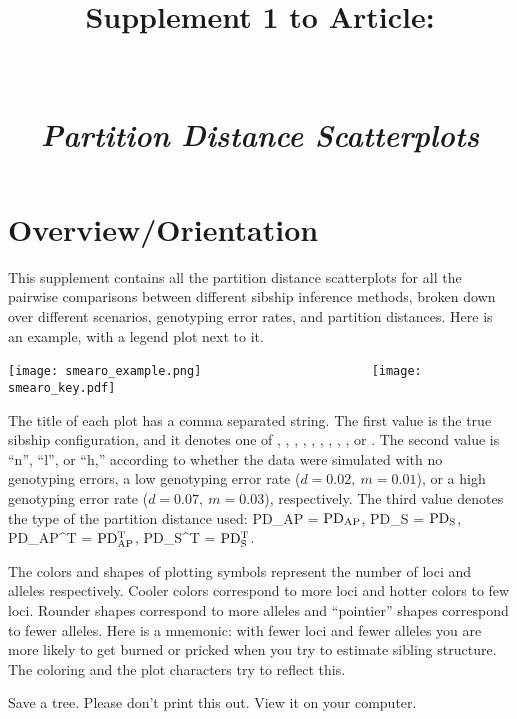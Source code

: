 \documentclass[11pt,landscape]{report}
\title{Supplement 1 to Article:\\
\ArticleName\\
\mbox{}\\
{\em Partition Distance Scatterplots} }
\begin{document}
\maketitle
\section{Overview/Orientation}
This supplement contains all the partition distance scatterplots for all the pairwise comparisons between different sibship inference methods, broken down over different scenarios, genotyping error rates, and partition distances. Here is an example, with a legend plot next to it.
\begin{center}
\texttt{[image: smearo\_example.png]}
~~~~~~~~~~~~~~~~~~~~~~~
\texttt{[image: smearo\_key.pdf]}
\end{center}
The title of each plot has a comma separated string.  The first value is the true sibship configuration, and it denotes one of 
\nosibs,
\allhalf,
\allpathalf,
\sfsnoh,
\sfswh,
\slfsgnoh,
\slfsgwh,
\onelargenoh,
\onelargewh, or
\lottalarge.
The second value is ``n'', ``l'', or ``h,'' according to whether the data were simulated with no genotyping errors, a low genotyping error rate ($d=0.02,~m=0.01$), or a high genotyping error rate ($d=0.07,~m=0.03$), respectively.
The third value denotes the type of the partition distance used: PD\_AP = $\mathrm{PD_{AP}}$, PD\_S = $\mathrm{PD_S}$, PD\_AP\^{}T = $\mathrm{PD_{AP}^T}$, PD\_S\^{}T = $\mathrm{PD_S^T}$.

The colors and shapes of plotting symbols represent the number of loci and alleles respectively.  Cooler colors correspond to more loci and hotter colors to few loci.  Rounder shapes correspond to more alleles and ``pointier'' shapes correspond to fewer alleles.  Here is a mnemonic: with fewer loci and fewer alleles you are more likely to get burned or pricked when you try to estimate sibling structure.  The coloring and the plot characters try to reflect this.  

Save a tree. Please don't print this out.  View it on your computer.
\newpage  
\tableofcontents

\newpage
\listoffigures


\end{document}
